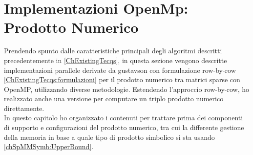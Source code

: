 \chapter[Implementazioni OpenMp: Prodotto Numerico]
{Implementazioni OpenMp:\\Prodotto Numerico}
\label{Chapter3}





Prendendo spunto dalle caratteristiche principali degli algoritmi descritti precedentemente in \ref{ChExistingTecqs}, 
in questa sezione vengono descritte implementazioni parallele derivate da gustavson \cite{gustavson} 
con formulazione row-by-row \ref{ChExistingTecqs:formulazioni} per il prodotto numerico tra matrici sparse con OpenMP, 
utilizzando diverse metodologie.
Estendendo l'approccio row-by-row, ho realizzato anche una versione per computare un triplo prodotto numerico direttamente.\\
In questo capitolo ho organizzato i contenuti per trattare prima dei componenti di supporto e configurazioni del prodotto numerico,
tra cui la differente gestione della memoria in base a quale tipo di prodotto simbolico si sta usando \ref{chSpMMSymb:UpperBound}.\\


